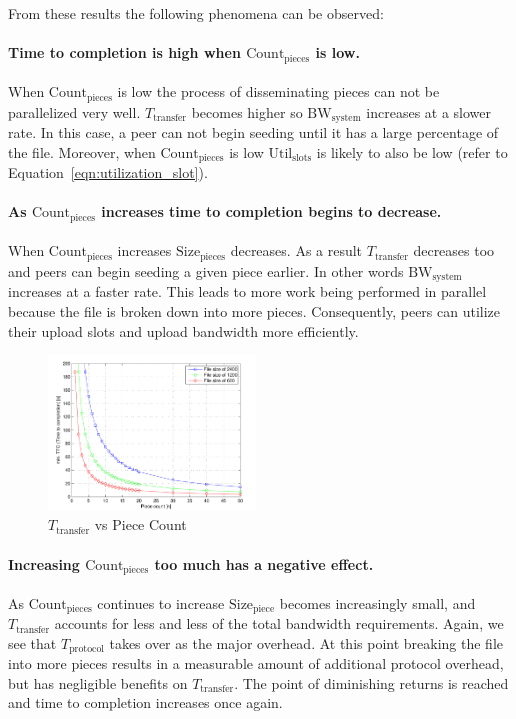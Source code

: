 \documentclass[a4paper,12pt,twocolumn]{article}
\newcommand{\eref}[1]{Equation~\ref{#1}}
\begin{document}
From these results the following phenomena can be observed:

\paragraph{Time to completion is high when $\text{Count}_{\text{pieces}}$ is low.}
When $\text{Count}_{\text{pieces}}$ is low the process of disseminating pieces can not be parallelized very well. $T_{\text{transfer}}$ becomes higher so $\text{BW}_{\text{system}}$ increases at a slower rate. 
In this case, a peer can not begin seeding until it has a large percentage of the file.
Moreover, when $\text{Count}_{\text{pieces}}$ is low $\text{Util}_{\text{slots}}$ is likely to also be low (refer to \eref{eqn:utilization_slot}).

\paragraph{As $\text{Count}_{\text{pieces}}$ increases time to completion begins to decrease.}
When $\text{Count}_{\text{pieces}}$ increases $\text{Size}_{\text{pieces}}$ decreases. As a result $T_{\text{transfer}}$ decreases too and peers can begin seeding a given piece earlier. In other words $\text{BW}_{\text{system}}$ increases at a faster rate.
This leads to more work being performed in parallel because the file is broken down into more pieces. 
Consequently, peers can utilize their upload slots and upload bandwidth more efficiently.

\begin{figure}[!htbp]
  \centering
  \includegraphics[width=0.49\textwidth]{figs/Experiment4_min_TTC}
  \caption{$T_{\text{transfer}}$ vs Piece Count}
  \label{fig:piece_count_ttransfer}
\end{figure}

\paragraph{Increasing $\text{Count}_{\text{pieces}}$ too much has a negative effect.}
As $\text{Count}_{\text{pieces}}$ continues to increase $\text{Size}_{\text{piece}}$ becomes increasingly small, and $T_{\text{transfer}}$ accounts for less and less of the total bandwidth requirements. Again, we see that $T_{\text{protocol}}$ takes over as the major overhead.
At this point breaking the file into more pieces results in a measurable amount of additional protocol overhead, but has negligible benefits on $T_{\text{transfer}}$. The point of diminishing returns is reached and time to completion increases once again.
\end{document}
